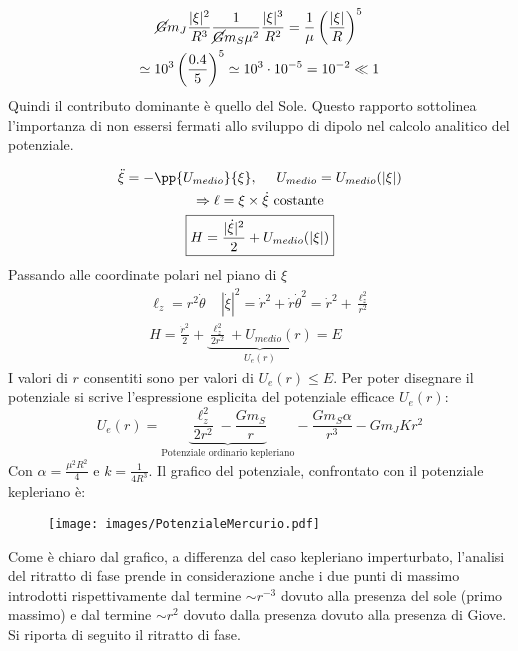 \documentclass[Main.tex]{subfiles}
\begin{document}
\begin{tema}
\begin{osservazione}
\begin{gather*}
	\cancel{G} m_J  \frac{|\xi|^2}{R^3} \frac{1}{\cancel{G}m_S \mu^2} \frac{|\xi|^3}{R^2} = \frac{1}{\mu} \left( \frac{|\xi|}{R} \right)^5 \\ \simeq 10^3 \left( \frac{ 0.4 }{5} \right)^5 \simeq 10^3 \cdot 10^{-5} = 10^{-2} \ll 1
\end{gather*}
Quindi il contributo dominante è quello del Sole. Questo rapporto sottolinea l'importanza di non essersi fermati allo sviluppo di dipolo nel calcolo analitico del potenziale.
\end{osservazione}
\begin{gather}
	\ddot \xi = - \pp{U_{medio}}{\xi},  \ \ \ \ U_{medio}= U_{medio}(|\xi|)\\
	\Rightarrow \ell = \xi \times \dot \xi \ \text{costante}\\
	\boxed{H = \frac{|\dot \xi|^2}{2} + U_{medio} ( |\xi|)}
\end{gather}
Passando alle coordinate polari nel piano di $\xi$
\begin{gather}
	\ell_z=r^2 \dot \theta  \ \ \ \ \ |\dot \xi|^2 = \dot r^2 + \dot r \dot \theta^2 = \dot r^2 + \frac{\ell_z^2}{r^2}\\
	\boxed{H = \frac{\dot r^2}{2} + \underbrace{\frac{\ell_z^2}{2r^2}+ U_{medio}(r)}_{U_e(r)}=E}
\end{gather}
I valori di $r$ consentiti sono per valori di $U_e(r) \leq E$.
Per poter disegnare il potenziale si scrive l'espressione esplicita del potenziale efficace $U_e(r)$:
\begin{equation}
	U_e(r) = \underbrace{\frac{\ell_z^2}{2r^2} - \frac{Gm_S}{r}}_{\text{Potenziale ordinario kepleriano}} - \frac{Gm_S \alpha}{r^3} - Gm_J Kr^2
\end{equation}
Con $\alpha= \frac{\mu^2R^2}{4}$ e $k=\frac{1}{4R^3}$. 
Il grafico del potenziale, confrontato con il potenziale kepleriano è:

\begin{figure}[H]
    \centering
    \texttt{[image: images/PotenzialeMercurio.pdf]}
\end{figure}


Come è chiaro dal grafico, a differenza del caso kepleriano imperturbato, l'analisi del ritratto di fase prende in considerazione anche i due punti di massimo introdotti rispettivamente dal termine $\sim r^{-3}$ dovuto alla presenza del sole (primo massimo) e dal termine $\sim r^2$ dovuto dalla presenza  dovuto alla presenza di Giove. Si riporta di seguito il ritratto di fase.


\end{tema}
\end{document}
